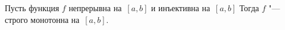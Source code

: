 
Пусть функция $f$ непрерывна на~$[a,b]$ и инъективна на~$[a,b]$ Тогда $f$ "--- строго монотонна на~$[a,b]$.
